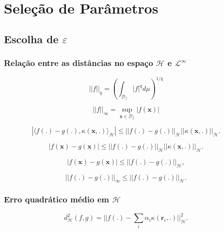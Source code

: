 \chapter{Seleção de Parâmetros} \label{cap:selecao}

\section{Escolha de $\varepsilon$}

\subsection{Relação entre as distâncias no espaço $\mathcal{H}$ e $\mathcal{L}^{\infty}$}

\begin{equation}
    ||f||_{q} = \left(\int_{\mathcal{D}_f}|f|^qd\mu\right)^{1/q}
\end{equation}

\begin{equation}
    ||f||_\infty = \sup_{\mathbf{x} \in \mathcal{D}_f} |f(\mathbf{x})| 
\end{equation}

\begin{equation}
    |\langle f(.) - g(.), \kappa(\mathbf{x},.) \rangle_{\mathcal{H}}| \leq ||f(.)-g(.)||_{\mathcal{H}}||\kappa(\mathbf{x},.)||_{\mathcal{H}}.
\end{equation}

\begin{equation}
    |f(\mathbf{x}) - g(\mathbf{x})| \leq ||f(.)-g(.)||_{\mathcal{H}}||\kappa(\mathbf{x},.)||_{\mathcal{H}}.
\end{equation}

\begin{equation}
    |f(\mathbf{x}) - g(\mathbf{x})| \leq ||f(.)-g(.)||_{\mathcal{H}},
\end{equation}

\begin{equation}
    ||f(.) - g(.)||_\infty \leq ||f(.)-g(.)||_{\mathcal{H}}.
\end{equation}

\subsection{Erro quadrático médio em $\mathcal{H}$}

\begin{equation}
    d^2_\mathcal{H}(f,g) = ||f(.) - \sum_{i}\alpha_i \kappa(\mathbf{r}_i,.)||^2_{\mathcal{H}}.
\end{equation}

